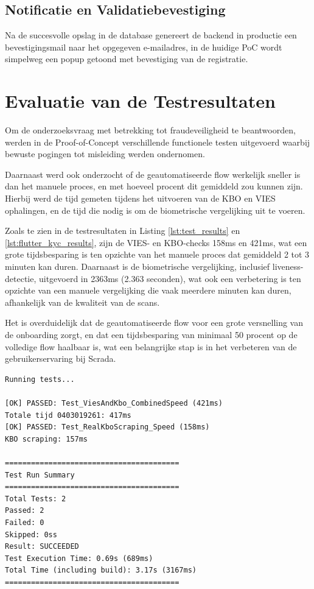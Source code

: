 \begin{itemize}
\subsection{Notificatie en Validatiebevestiging}
Na de succesvolle opslag in de database genereert de backend in productie een bevestigingsmail naar het opgegeven e-mailadres, in de huidige PoC 
wordt simpelweg een popup getoond met bevestiging van de registratie.

\section{Evaluatie van de Testresultaten}
Om de onderzoeksvraag met betrekking tot fraudeveiligheid te beantwoorden, 
werden in de Proof-of-Concept verschillende functionele testen uitgevoerd waarbij bewuste pogingen tot misleiding werden ondernomen.

Daarnaast werd ook onderzocht of de geautomatiseerde flow werkelijk sneller is dan het manuele proces, en met hoeveel procent dit gemiddeld zou kunnen zijn.
Hierbij werd de tijd gemeten tijdens het uitvoeren van de KBO en VIES ophalingen, en de tijd die nodig is om de biometrische vergelijking uit te voeren.

Zoals te zien in de testresultaten in Listing \ref{lst:test_results} en \ref{lst:flutter_kyc_results}, zijn de VIES- en KBO-checks 158ms en 421ms, 
wat een grote tijdsbesparing is ten opzichte van het manuele proces dat gemiddeld 2 tot 3 minuten kan duren. Daarnaast is de biometrische vergelijking, 
inclusief liveness-detectie, uitgevoerd in 2363ms (2.363 seconden), wat ook een verbetering is ten opzichte van een manuele vergelijking die vaak meerdere minuten kan duren, 
afhankelijk van de kwaliteit van de scans.

Het is overduidelijk dat de geautomatiseerde flow voor een grote versnelling van de onboarding zorgt, en dat een tijdsbesparing van minimaal 50 procent op de volledige flow haalbaar is, wat een belangrijke stap is in het verbeteren van de gebruikerservaring bij Scrada.

\begin{lstlisting}[style=consoleStyle, caption={Resultaten van de performantietesten in C#}, label={lst:test_results}]
Running tests...

[OK] PASSED: Test_ViesAndKbo_CombinedSpeed (421ms)
Totale tijd 0403019261: 417ms
[OK] PASSED: Test_RealKboScraping_Speed (158ms)
KBO scraping: 157ms

========================================
Test Run Summary
========================================
Total Tests: 2
Passed: 2
Failed: 0
Skipped: 0ss
Result: SUCCEEDED
Test Execution Time: 0.69s (689ms)
Total Time (including build): 3.17s (3167ms)
========================================
\end{lstlisting}


\end{itemize}
